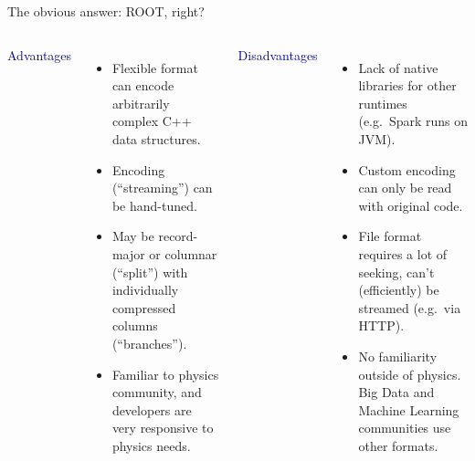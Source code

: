\documentclass{beamer}
\begin{document}
\begin{frame}{The obvious answer: ROOT, right?}
\vspace{0.25 cm}
\begin{columns}[t]
\textcolor{darkblue}{Advantages}

\begin{itemize}
\item Flexible format can encode arbitrarily complex C++ data structures.

\item Encoding (``streaming'') can be hand-tuned.

\item May be record-major or columnar (``split'') with individually compressed columns (``branches'').

\item Familiar to physics community, and developers are very responsive to physics needs.

\end{itemize}

\textcolor{darkblue}{Disadvantages}

\begin{itemize}
\item Lack of native libraries for other runtimes (e.g.\ Spark runs on JVM).

\item Custom encoding can only be read with original code.

\item File format requires a lot of seeking, can't (efficiently) be streamed (e.g.\ via HTTP).

\item No familiarity outside of physics. Big Data and Machine Learning communities use other formats.
\end{itemize}
\end{columns}
\end{frame}
\end{document}

